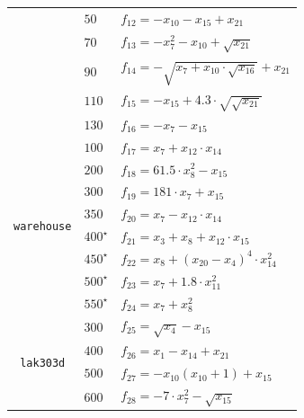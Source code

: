 \begin{table}[t!]
{\begin{tabular}{c|l|l}
            & $ 50 $ & $ f_{12} = - x_{10}- x_{15} + x_{21} $ \\
            & $ 70 $ & $ f_{13} = - x_{7}^2 - x_{10} + \sqrt{x_{21}} $ \\
            & $ 90 $ & $ f_{14} = - \sqrt{x_{7} + x_{10} \cdot \sqrt{x_{16}}} + x_{21} $ \\
            & $ 110 $ & $ f_{15} = - x_{15} + 4.3 \cdot \sqrt{\sqrt{x_{21}}} $ \\
            & $ 130 $ & $ f_{16} = - x_{7} - x_{15} $ \\
            \hline
            \multirow{8}{*}{\begin{turn}{90} {\tt warehouse} \end{turn}}
            & $ 100 $ & $ f_{17} = x_{7} + x_{12} \cdot x_{14} $ \\
            & $ 200 $ & $ f_{18} = 61.5 \cdot x_{8}^2 - x_{15} $ \\
            & $ 300 $ & $ f_{19} = 181 \cdot x_{7} + x_{15} $ \\
            & $ 350 $ & $ f_{20} = x_{7} - x_{12} \cdot x_{14} $ \\
            & $ 400^\star $ & $ f_{21} = x_{3} + x_{8} + x_{12} \cdot x_{15} $ \\
            & $ 450^\star $ & $ f_{22} = x_{8} + \left(x_{20} - x_{4}\right)^4 \cdot x_{14}^2 $ \\
            & $ 500^\star $ & $ f_{23} = x_{7} + 1.8 \cdot x_{11}^2 $ \\
            & $ 550^\star $ & $ f_{24} = x_{7} + x_{8}^2 $ \\
            \hline
            \multirow{7}{*}{\begin{turn}{90} {\tt lak303d} \end{turn}}
            & $ 300 $ & $ f_{25} = \sqrt{x_{4}} - x_{15} $ \\
            & $ 400 $ & $ f_{26} = x_{1} - x_{14} + x_{21} $ \\
            & $ 500 $ & $ f_{27} = - x_{10}(x_{10} + 1) + x_{15} $ \\
            & $ 600 $ & $ f_{28} = - 7 \cdot x_{7}^2 - \sqrt{x_{15}} $ \\

\end{tabular}}
\end{table}
